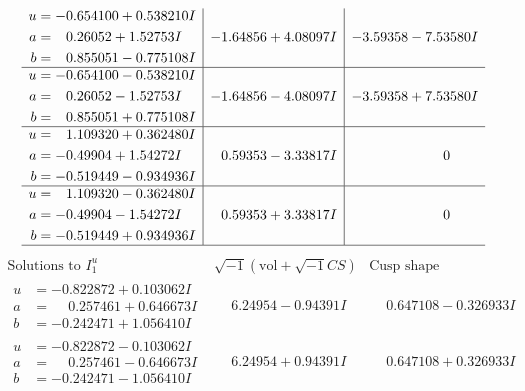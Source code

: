 \documentclass[1p]{elsarticle_modified}
\theoremstyle{definition}
\newcommand{\I}{\sqrt{-1}}
\begin{document}
$$\begin{array}{c|c|c}
\begin{aligned}
u &= -0.654100 + 0.538210 I \\
a &= \phantom{-}0.26052 + 1.52753 I \\
b &= \phantom{-}0.855051 - 0.775108 I\end{aligned}
 & -1.64856 + 4.08097 I & -3.59358 - 7.53580 I \\ \hline\begin{aligned}
u &= -0.654100 - 0.538210 I \\
a &= \phantom{-}0.26052 - 1.52753 I \\
b &= \phantom{-}0.855051 + 0.775108 I\end{aligned}
 & -1.64856 - 4.08097 I & -3.59358 + 7.53580 I \\ \hline\begin{aligned}
u &= \phantom{-}1.109320 + 0.362480 I \\
a &= -0.49904 + 1.54272 I \\
b &= -0.519449 - 0.934936 I\end{aligned}
 & \phantom{-}0.59353 - 3.33817 I & \phantom{-0.000000 } 0 \\ \hline\begin{aligned}
u &= \phantom{-}1.109320 - 0.362480 I \\
a &= -0.49904 - 1.54272 I \\
b &= -0.519449 + 0.934936 I\end{aligned}
 & \phantom{-}0.59353 + 3.33817 I & \phantom{-0.000000 } 0\\
 \hline 
 \end{array}$$\newpage$$\begin{array}{c|c|c}  
\text{Solutions to }I^u_{1}& \I (\text{vol} + \sqrt{-1}CS) & \text{Cusp shape}\\
 \hline 
\begin{aligned}
u &= -0.822872 + 0.103062 I \\
a &= \phantom{-}0.257461 + 0.646673 I \\
b &= -0.242471 + 1.056410 I\end{aligned}
 & \phantom{-}6.24954 - 0.94391 I & \phantom{-}0.647108 - 0.326933 I \\ \hline\begin{aligned}
u &= -0.822872 - 0.103062 I \\
a &= \phantom{-}0.257461 - 0.646673 I \\
b &= -0.242471 - 1.056410 I\end{aligned}
 & \phantom{-}6.24954 + 0.94391 I & \phantom{-}0.647108 + 0.326933 I \\ \hline\begin{aligned}

\end{aligned}
\end{array}$$
\end{document}

